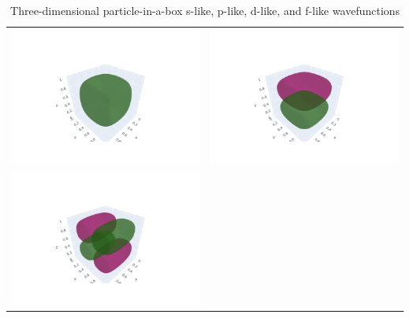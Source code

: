 \documentclass[11pt]{article}
\begin{document}
\begin{table}
\caption{Three-dimensional particle-in-a-box s-like, p-like, d-like, and f-like wavefunctions}
\begin{tabular}{cc}
\includegraphics[scale=0.5]{./Images/psi_s.png} &
\includegraphics[scale=0.5]{./Images/psi_p.png} \\
\includegraphics[scale=0.5]{./Images/psi_d.png} &

\end{tabular}
\end{table}
\end{document}
